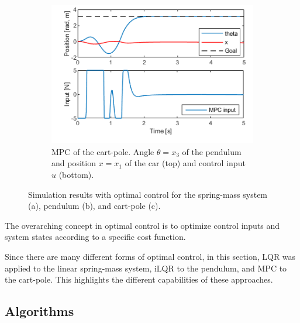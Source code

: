 \documentclass[letterpaper, 10 pt, conference]{ieeeconf}  %
\begin{document}
\begin{figure}[!thp]
\begin{subfigure}{0.325\textwidth}
	\end{subfigure}
	\begin{subfigure}{0.325\textwidth}
		\includegraphics[width=\textwidth]{CP.png}
		\caption{MPC of the cart-pole. Angle $\theta=x_3$ of the pendulum and position $x=x_1$ of the car (top) and control input $u$ (bottom).}\label{fig:JanCP}
	\end{subfigure}\caption{Simulation results with optimal control for the spring-mass system (a), pendulum (b), and cart-pole (c).}\label{fig:PILCO}
\end{figure} 
The overarching concept in optimal control is to optimize control inputs and system states according to a specific cost function. 


Since there are many different forms of optimal control, in this section, LQR was applied to the linear spring-mass system, iLQR to the pendulum, and MPC to the cart-pole. This highlights the different capabilities of these approaches.
\subsection{Algorithms}
\end{document}
